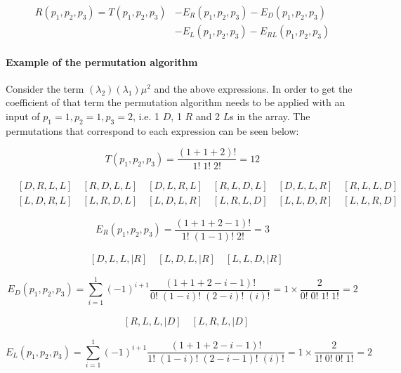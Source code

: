 \begin{align*}
    R(p_1, p_2, p_3) = T(p_1, p_2, p_3) & - E_R(p_1, p_2, p_3) -
    E_D(p_1, p_2, p_3) \\ 
    & - E_L(p_1, p_2, p_3) - E_{RL}(p_1, p_2, p_3)
\end{align*}

\paragraph{Example of the permutation algorithm}
Consider the term \((\lambda_2) (\lambda_1) \mu^2\) and the above expressions.
In order to get the coefficient of that term the permutation algorithm needs to 
be applied with an input of \(p_1=1, p_2=1, p_3=2\), i.e. 1 \(D\), 1 \(R\) and 2 
\(L\)s in the array.
The permutations that correspond to each expression can be seen below:

\begin{equation*}
    T(p_1, p_2, p_3) = \frac{(1+1+2)!}{1! \; 1! \; 2!} = 12
\end{equation*}

\begin{align*}
    & [D, R, L, L] \quad [R, D, L, L] \quad [D, L, R, L] \quad 
    [R, L, D, L] \quad [D, L, L, R] \quad [R, L, L, D] \\
    & [L, D, R, L] \quad [L, R, D, L] \quad [L, D, L, R] \quad 
    [L, R, L, D] \quad [L, L, D, R] \quad [L, L, R, D]
\end{align*}

\begin{equation*}
    E_R(p_1, p_2, p_3) = \frac{(1+1+2-1)!}{1! \; (1-1)! \; 2!} = 3
\end{equation*}

\begin{align*}
    & [D, L, L, | R] \quad [L, D, L, | R] \quad [L, L, D, | R]
\end{align*}


\begin{equation*}
    E_D(p_1, p_2, p_3) = \sum_{i=1}^{1} (-1)^{i+1} \frac{(1+1+2-i-1)!}{0! \; 
    (1-i)! \; (2-i)! \; (i)!} = 1 \times \frac{2}{0! \; 0! \; 1! \; 1!} = 2
\end{equation*}

\begin{align*}
    & [R, L, L, | D] \quad [L, R, L, | D] 
\end{align*}


\begin{equation*}
    E_L(p_1, p_2, p_3) = \sum_{i=1}^{1} (-1)^{i+1} 
    \frac{(1+1+2-i-1)!}{1! \; (1-i)! \; (2-i-1)! \; (i)!} 
    = 1 \times \frac{2}{1! \; 0! \; 0! \; 1!} = 2
\end{equation*}

